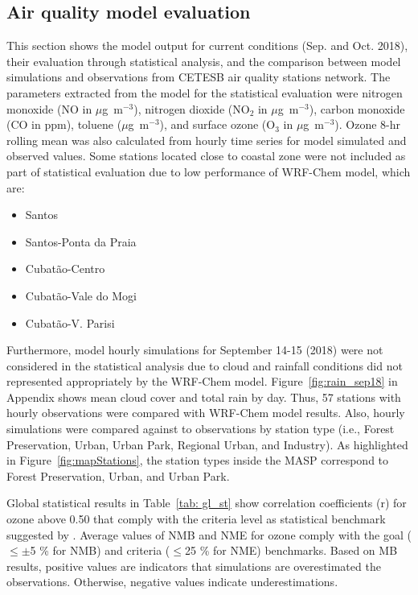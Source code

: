   \subsection{Air quality model evaluation} \label{subsec:res_aq}
  This section shows the model output for current conditions (Sep. and Oct. 2018), their evaluation through statistical analysis, and the comparison between model simulations and observations from CETESB air quality stations network.
  The parameters extracted from the model for the statistical evaluation were nitrogen monoxide (NO in $\mu$g~m$^{-3}$), nitrogen dioxide (NO$_2$ in $\mu$g~m$^{-3}$), carbon monoxide (CO in ppm), toluene ($\mu$g~m$^{-3}$), and surface ozone (O$_3$ in $\mu$g~m$^{-3}$).
   Ozone 8-hr rolling mean was also calculated from hourly time series for model simulated and observed values.
   Some stations located close to coastal zone were not included as part of statistical evaluation due to low performance of WRF-Chem model, which are:
   
   \begin{itemize}
   	\item Santos
   	\item Santos-Ponta da Praia
   	\item Cubat\~{a}o-Centro
   	\item Cubat\~{a}o-Vale do Mogi
   	\item Cubat\~{a}o-V. Parisi
   \end{itemize}
   
   Furthermore, model hourly simulations for September 14-15 (2018) were not considered in the statistical analysis due to cloud and rainfall conditions did not represented appropriately by the WRF-Chem model.
   Figure~\ref{fig:rain_sep18} in Appendix shows mean cloud cover and total rain by day.
   Thus, 57 stations with hourly observations were compared with WRF-Chem model results. Also, hourly simulations were compared against to observations by station type (i.e., Forest Preservation, Urban, Urban Park, Regional Urban, and Industry).
   As highlighted in Figure~\ref{fig:mapStations}, the station types inside the MASP correspond to Forest Preservation, Urban, and Urban Park.

  Global statistical results in Table~\ref{tab: gl_st} show correlation coefficients (r) for ozone  above 0.50 that comply with the criteria level as statistical benchmark suggested by \citet{Emery2017}.
  Average values of NMB and NME for ozone comply with the goal ($\leq\pm$5 \% for NMB) and criteria ($\leq$25 \% for NME) benchmarks.
  Based on MB results, positive values are indicators that simulations are overestimated the observations.
  Otherwise, negative values indicate underestimations.
  
